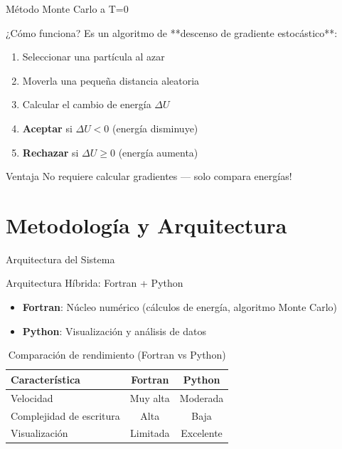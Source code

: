 \documentclass[10pt, aspectratio=169]{beamer}
\begin{document}
\begin{frame}{Método Monte Carlo a T=0 \cite{proyecto-molina2024}}
  \begin{alertblock}{¿Cómo funciona?}
    Es un algoritmo de **descenso de gradiente estocástico**:
    \begin{enumerate}
      \item Seleccionar una partícula al azar
      \item Moverla una pequeña distancia aleatoria
      \item Calcular el cambio de energía \( \Delta U \)
      \item \textbf{Aceptar} si \( \Delta U < 0 \) (energía disminuye)
      \item \textbf{Rechazar} si \( \Delta U \geq 0 \) (energía aumenta)
    \end{enumerate}
  \end{alertblock}

  \pause

  \begin{block}{Ventaja}
    No requiere calcular gradientes — solo compara energías!
  \end{block}
\end{frame}


\section{Metodología y Arquitectura}

\begin{frame}{Arquitectura del Sistema}
  \begin{block}{Arquitectura Híbrida: Fortran + Python}
    \begin{itemize}
      \item \textbf{Fortran}: Núcleo numérico (cálculos de energía, algoritmo Monte Carlo)
      \item \textbf{Python}: Visualización y análisis de datos
    \end{itemize}
  \end{block}

  \pause

  \begin{table}
    \centering
    \caption{Comparación de rendimiento (Fortran vs Python)}
    \begin{tabular}{lcc}
      \toprule
      Característica & Fortran & Python \\
      \midrule
      Velocidad & Muy alta & Moderada \\
      Complejidad de escritura & Alta & Baja \\
      Visualización & Limitada & Excelente \\
      \bottomrule
    \end{tabular}
  \end{table}
\end{frame}
\end{document}
